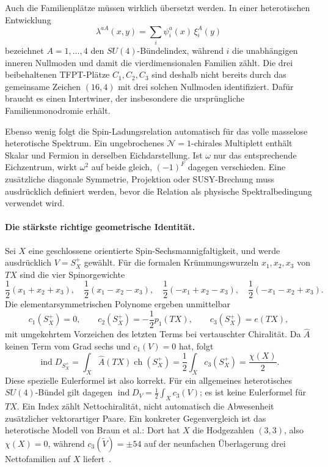 Auch die Familienplätze müssen wirklich übersetzt werden. In einer heterotischen Entwicklung
\begin{equation}
\lambda^{aA}(x,y)=\sum_i\psi_i^a(x)\,\xi_i^A(y)
\end{equation}
bezeichnet $A=1,\ldots,4$ den $SU(4)$-Bündelindex, während $i$ die unabhängigen inneren Nullmoden und damit die vierdimensionalen Familien zählt. Die drei beibehaltenen TFPT-Plätze $C_1,C_2,C_3$ sind deshalb nicht bereits durch das gemeinsame Zeichen $(16,4)$ mit drei solchen Nullmoden identifiziert. Dafür braucht es einen Intertwiner, der insbesondere die ursprüngliche Familienmonodromie erhält.

Ebenso wenig folgt die Spin-Ladungsrelation automatisch für das volle masselose heterotische Spektrum. Ein ungebrochenes $\mathcal N=1$-chirales Multiplett enthält Skalar und Fermion in derselben Eichdarstellung. Ist $\omega$ nur das entsprechende Eichzentrum, wirkt $\omega^2$ auf beide gleich, $(-1)^F$ dagegen verschieden. Eine zusätzliche diagonale Symmetrie, Projektion oder SUSY-Brechung muss ausdrücklich definiert werden, bevor die Relation als physische Spektralbedingung verwendet wird.

\paragraph{Die stärkste richtige geometrische Identität.}
Sei $X$ eine geschlossene orientierte Spin-Sechsmannigfaltigkeit, und werde ausdrücklich $V=S_X^+$ gewählt. Für die formalen Krümmungswurzeln $x_1,x_2,x_3$ von $TX$ sind die vier Spinorgewichte
\begin{equation}
\frac12(x_1+x_2+x_3),\quad\frac12(x_1-x_2-x_3),\quad
\frac12(-x_1+x_2-x_3),\quad\frac12(-x_1-x_2+x_3).
\end{equation}
Die elementarsymmetrischen Polynome ergeben unmittelbar
\begin{equation}\label{eq:wallchern}
c_1(S_X^+)=0,\qquad c_2(S_X^+)=-\frac12p_1(TX),\qquad
c_3(S_X^+)=e(TX),
\end{equation}
mit umgekehrtem Vorzeichen des letzten Terms bei vertauschter Chiralität. Da $\widehat A$ keinen Term vom Grad sechs und $c_1(V)=0$ hat, folgt
\begin{equation}\label{eq:wallindex}
\operatorname{ind}D_{S_X^+}
=\int_X\widehat A(TX)\operatorname{ch}(S_X^+)
=\frac12\int_X c_3(S_X^+)=\frac{\chi(X)}2.
\end{equation}
Diese spezielle Eulerformel ist also korrekt. Für ein allgemeines heterotisches $SU(4)$-Bündel gilt dagegen $\operatorname{ind}D_V=\tfrac12\int_Xc_3(V)$; es ist keine Eulerformel für $TX$. Ein Index zählt Nettochiralität, nicht automatisch die Abwesenheit zusätzlicher vektorartiger Paare. Ein konkreter Gegenvergleich ist das heterotische Modell von Braun et al.: Dort hat $X$ die Hodgezahlen $(3,3)$, also $\chi(X)=0$, während $c_3(\widetilde V)=\pm54$ auf der neunfachen Überlagerung drei Nettofamilien auf $X$ liefert~\cite{braunheterotic}.


